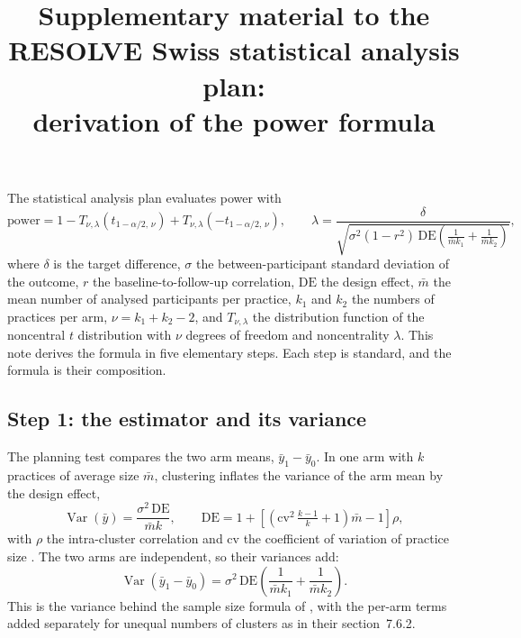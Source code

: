 \documentclass[11pt,a4paper]{article}
\title{\large\bfseries Supplementary material to the RESOLVE Swiss
statistical analysis plan:\\ derivation of the power formula}
\author{}
\date{}
\begin{document}
\maketitle

The statistical analysis plan evaluates power with
\begin{equation}
\label{eq:power}
\mathrm{power} = 1 - T_{\nu,\lambda}\!\left(t_{1-\alpha/2,\,\nu}\right)
               + T_{\nu,\lambda}\!\left(-t_{1-\alpha/2,\,\nu}\right),
\qquad
\lambda = \frac{\delta}{\sqrt{\sigma^2 (1-r^2)\,\mathrm{DE}
\left(\frac{1}{\bar m k_1}+\frac{1}{\bar m k_2}\right)}},
\end{equation}
where $\delta$ is the target difference, $\sigma$ the between-participant
standard deviation of the outcome, $r$ the baseline-to-follow-up
correlation, $\mathrm{DE}$ the design effect, $\bar m$ the mean number of
analysed participants per practice, $k_1$ and $k_2$ the numbers of practices
per arm, $\nu = k_1 + k_2 - 2$, and $T_{\nu,\lambda}$ the distribution
function of the noncentral $t$ distribution with $\nu$ degrees of freedom
and noncentrality $\lambda$. This note derives the formula in five
elementary steps. Each step is standard, and the formula is their
composition.

\subsection*{Step 1: the estimator and its variance}

The planning test compares the two arm means, $\bar y_1 - \bar y_0$. In one
arm with $k$ practices of average size $\bar m$, clustering inflates the
variance of the arm mean by the design effect,
\begin{equation}
\operatorname{Var}(\bar y) = \frac{\sigma^2\,\mathrm{DE}}{\bar m k},
\qquad
\mathrm{DE} = 1 + \left[ \left( \mathrm{cv}^2\,\tfrac{k-1}{k} + 1 \right)
\bar m - 1 \right] \rho ,
\end{equation}
with $\rho$ the intra-cluster correlation and $\mathrm{cv}$ the coefficient
of variation of practice size \citep[eq.~1]{eldridge2006}. The two arms are
independent, so their variances add:
\begin{equation}
\label{eq:vardiff}
\operatorname{Var}(\bar y_1 - \bar y_0)
= \sigma^2\,\mathrm{DE} \left( \frac{1}{\bar m k_1} + \frac{1}{\bar m k_2}
\right).
\end{equation}
This is the variance behind the sample size formula of
\citet[eq.~7.12]{hayes2017}, with the per-arm terms added separately for
unequal numbers of clusters as in their section~7.6.2.
\end{document}
